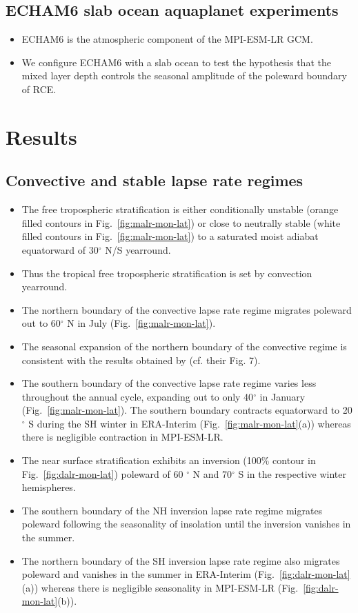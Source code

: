 \documentclass{ametsocV5}
\begin{document}
\subsection{ECHAM6 slab ocean aquaplanet experiments}
\begin{itemize}
  \item ECHAM6 is the atmospheric component of the MPI-ESM-LR GCM.
  \item We configure ECHAM6 with a slab ocean to test the hypothesis that the mixed layer depth controls the seasonal amplitude of the poleward boundary of RCE.
\end{itemize}

\section{Results}
\subsection{Convective and stable lapse rate regimes}
\begin{itemize}
  \item The free tropospheric stratification is either conditionally unstable (orange filled contours in Fig.~\ref{fig:malr-mon-lat}) or close to neutrally stable (white filled contours in Fig.~\ref{fig:malr-mon-lat}) to a saturated moist adiabat equatorward of 30$^{\circ}$ N/S yearround.
  \item Thus the tropical free tropospheric stratification is set by convection yearround.
  \item The northern boundary of the convective lapse rate regime migrates poleward out to 60$^{\circ}$ N in July (Fig.~\ref{fig:malr-mon-lat}).
  \item The seasonal expansion of the northern boundary of the convective regime is consistent with the results obtained by \cite{stone1979} (cf. their Fig. 7).
  \item The southern boundary of the convective lapse rate regime varies less throughout the annual cycle, expanding out to only 40$^{\circ}$ in January (Fig.~\ref{fig:malr-mon-lat}). The southern boundary contracts equatorward to 20$^{\circ}$ S during the SH winter in ERA-Interim (Fig.~\ref{fig:malr-mon-lat}(a)) whereas there is negligible contraction in MPI-ESM-LR.
  \item The near surface stratification exhibits an inversion (100\% contour in Fig.~\ref{fig:dalr-mon-lat}) poleward of 60 $^{\circ}$ N and 70$^{\circ}$ S in the respective winter hemispheres.
  \item The southern boundary of the NH inversion lapse rate regime migrates poleward following the seasonality of insolation until the inversion vanishes in the summer.
        \item The northern boundary of the SH inversion lapse rate regime also migrates poleward and vanishes in the summer in ERA-Interim (Fig.~\ref{fig:dalr-mon-lat}(a)) whereas there is negligible seasonality in MPI-ESM-LR (Fig.~\ref{fig:dalr-mon-lat}(b)).
\end{itemize}
\end{document}
